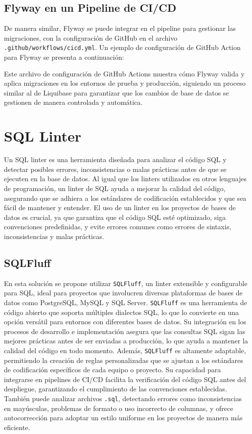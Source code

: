 \documentclass{IEEEtran}
\begin{document}
\subsection{Flyway en un Pipeline de CI/CD}
De manera similar, Flyway se puede integrar en el pipeline para gestionar las migraciones, con la configuración de GitHub en el archivo \texttt{.github/workflows/cicd.yml}. Un ejemplo de configuración de GitHub Action para Flyway se presenta a continuación:


Este archivo de configuración de GitHub Actions muestra cómo Flyway valida y aplica migraciones en los entornos de prueba y producción, siguiendo un proceso similar al de Liquibase para garantizar que los cambios de base de datos se gestionen de manera controlada y automática.

\section{SQL Linter}

Un SQL linter es una herramienta diseñada para analizar el código SQL y detectar posibles errores, inconsistencias o malas prácticas antes de que se ejecuten en la base de datos. Al igual que los linters utilizados en otros lenguajes de programación, un linter de SQL ayuda a mejorar la calidad del código, asegurando que se adhiera a los estándares de codificación establecidos y que sea fácil de mantener y entender. El uso de un linter en los proyectos de bases de datos es crucial, ya que garantiza que el código SQL esté optimizado, siga convenciones predefinidas, y evite errores comunes como errores de sintaxis, inconsistencias y malas prácticas.

\subsection{SQLFluff}

En esta solución se propone utilizar \texttt{SQLFluff}, un linter extensible y configurable para SQL, ideal para proyectos que involucren diversas plataformas de bases de datos como PostgreSQL, MySQL y SQL Server. \texttt{SQLFluff} es una herramienta de código abierto que soporta múltiples dialectos SQL, lo que lo convierte en una opción versátil para entornos con diferentes bases de datos. Su integración en los procesos de desarrollo e implementación asegura que las consultas SQL sigan las mejores prácticas antes de ser enviadas a producción, lo que ayuda a mantener la calidad del código en todo momento. Además, \texttt{SQLFluff} es altamente adaptable, permitiendo la creación de reglas personalizadas que se ajustan a los estándares de codificación específicos de cada equipo o proyecto. Su capacidad para integrarse en pipelines de CI/CD facilita la verificación del código SQL antes del despliegue, garantizando el cumplimiento de las convenciones establecidas. También puede analizar archivos \texttt{.sql}, detectando errores como inconsistencias en mayúsculas, problemas de formato o uso incorrecto de columnas, y ofrece autocorrección para adoptar un estilo uniforme en los proyectos de manera más eficiente.
\end{document}
